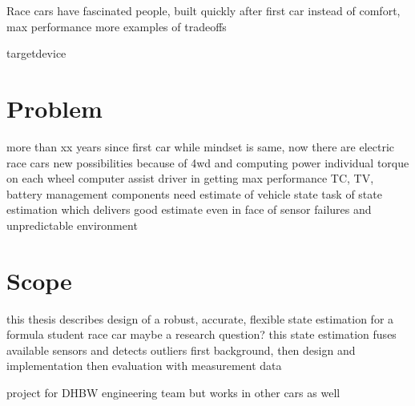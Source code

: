 Race cars have fascinated people, built quickly after first car
instead of comfort, max performance
more examples of tradeoffs

\gls{targetdevice}

\section{Problem}
more than xx years since first car
while mindset is same, now there are electric race cars
new possibilities because of 4wd and computing power
individual torque on each wheel
computer assist driver in getting max performance
TC, TV, battery management
components need estimate of vehicle state
task of state estimation which delivers good estimate even in face of sensor failures and unpredictable environment

\section{Scope}
this thesis describes design of a robust, accurate, flexible state estimation for a formula student race car
maybe a research question?
this state estimation fuses available sensors and detects outliers
first background, then design and implementation
then evaluation with measurement data

project for DHBW engineering team but works in other cars as well
